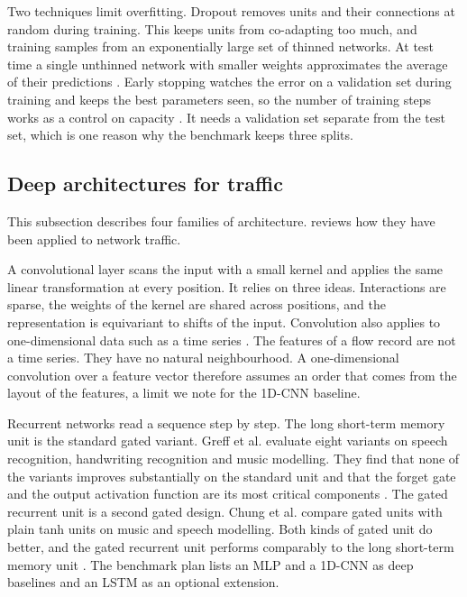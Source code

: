 Two techniques limit overfitting. Dropout removes units and their connections
at random during training. This keeps units from co-adapting too much, and
training samples from an exponentially large set of thinned networks. At test
time a single unthinned network with smaller weights approximates the average
of their predictions \citep{srivastava2014dropout}. Early stopping watches the error on a
validation set during training and keeps the best parameters seen, so the
number of training steps works as a control on capacity
\citep{goodfellow2016deep}. It needs a validation set separate from the test
set, which is one reason why the benchmark keeps three splits.

\subsection{Deep architectures for traffic}
\label{sec:dl-architectures}

This subsection describes four families of architecture. 
reviews how they have been applied to network traffic.

A convolutional layer scans the input with a small kernel and applies the same
linear transformation at every position. It relies on three ideas. Interactions
are sparse, the weights of the kernel are shared across positions, and the
representation is equivariant to shifts of the input. Convolution also applies
to one-dimensional data such as a time series \citep{goodfellow2016deep}. The
features of a flow record are not a time series. They have no natural
neighbourhood. A one-dimensional convolution over a feature vector therefore
assumes an order that comes from the layout of the features, a limit we note
for the 1D-CNN baseline.

Recurrent networks read a sequence step by step. The long short-term memory
unit is the standard gated variant. Greff et al. evaluate eight variants on
speech recognition, handwriting recognition and music modelling. They find that
none of the variants improves substantially on the standard unit and that the
forget gate and the output activation function are its most critical
components \citep{greff2015lstm}. The gated recurrent unit is a second gated
design. Chung et al. compare gated units with plain tanh units on music and
speech modelling. Both kinds of gated unit do better, and the gated recurrent
unit performs comparably to the long short-term memory unit
\citep{chung2014empirical}. The benchmark plan lists an MLP and a 1D-CNN as
deep baselines and an LSTM as an optional extension.

